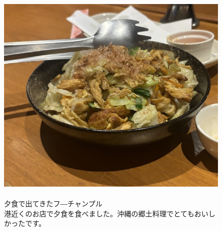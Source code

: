 \documentclass[../main]{subfiles}
\begin{document}
\begin{figure}[H]
  \begin{minipage}[b]{0.48\columnwidth}
    \caption{\\
    夕食で出てきたフ―チャンプル\\
    港近くのお店で夕食を食べました。沖縄の郷土料理でとてもおいしかったです。
    }
  \end{minipage}
  \hspace{0.04\columnwidth} %
  \begin{minipage}[b]{0.48\columnwidth}
    \centering
    \includegraphics[width=0.8\columnwidth]{figure/hu-tyanpuru.jpg}
  \end{minipage}
\end{figure}
\end{document}
